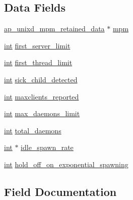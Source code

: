 \subsection*{Data Fields}
\begin{DoxyCompactItemize}
\item 
\hyperlink{structap__unixd__mpm__retained__data}{ap\+\_\+unixd\+\_\+mpm\+\_\+retained\+\_\+data} $\ast$ \hyperlink{structevent__retained__data_a077be32e8e6c2884273d710164dad105}{mpm}
\item 
\hyperlink{pcre_8txt_a42dfa4ff673c82d8efe7144098fbc198}{int} \hyperlink{structevent__retained__data_ad5b227c992fde4c5e4c3d18f972477a6}{first\+\_\+server\+\_\+limit}
\item 
\hyperlink{pcre_8txt_a42dfa4ff673c82d8efe7144098fbc198}{int} \hyperlink{structevent__retained__data_ab9c8a390f1ab058619497055f136a571}{first\+\_\+thread\+\_\+limit}
\item 
\hyperlink{pcre_8txt_a42dfa4ff673c82d8efe7144098fbc198}{int} \hyperlink{structevent__retained__data_a5f1b534cd45964ac6b152dbd004cec7d}{sick\+\_\+child\+\_\+detected}
\item 
\hyperlink{pcre_8txt_a42dfa4ff673c82d8efe7144098fbc198}{int} \hyperlink{structevent__retained__data_a64a1619e3c9e33374859c1880f66e7df}{maxclients\+\_\+reported}
\item 
\hyperlink{pcre_8txt_a42dfa4ff673c82d8efe7144098fbc198}{int} \hyperlink{structevent__retained__data_a70fe8f55b4f7dcfd8a54593c684cab29}{max\+\_\+daemons\+\_\+limit}
\item 
\hyperlink{pcre_8txt_a42dfa4ff673c82d8efe7144098fbc198}{int} \hyperlink{structevent__retained__data_a33a48ee4d4414e2b6e3be332bd0f64c4}{total\+\_\+daemons}
\item 
\hyperlink{pcre_8txt_a42dfa4ff673c82d8efe7144098fbc198}{int} $\ast$ \hyperlink{structevent__retained__data_a9ac607b151cf3e3879cc2fa0df170517}{idle\+\_\+spawn\+\_\+rate}
\item 
\hyperlink{pcre_8txt_a42dfa4ff673c82d8efe7144098fbc198}{int} \hyperlink{structevent__retained__data_a13d3ba6f1afbb67688cb38af64d05e5b}{hold\+\_\+off\+\_\+on\+\_\+exponential\+\_\+spawning}
\end{DoxyCompactItemize}


\subsection{Field Documentation}
